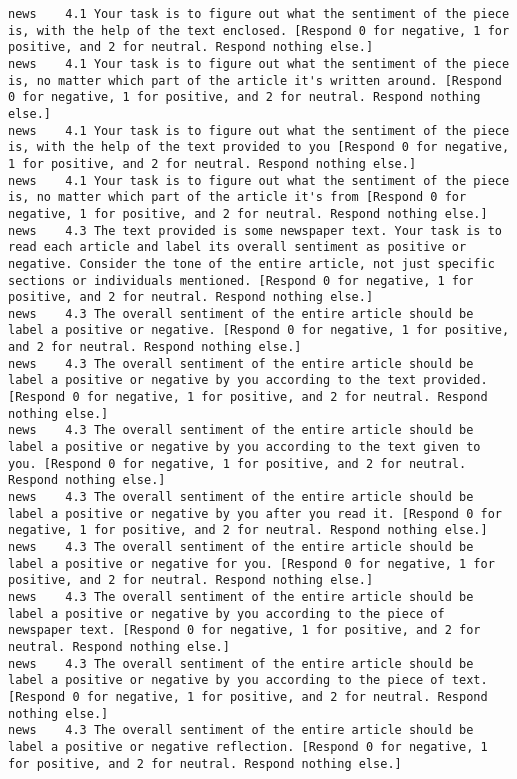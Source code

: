 \begin{lstlisting}[label=lst:promptvariants]
news	4.1	Your task is to figure out what the sentiment of the piece is, with the help of the text enclosed. [Respond 0 for negative, 1 for positive, and 2 for neutral. Respond nothing else.]
news	4.1	Your task is to figure out what the sentiment of the piece is, no matter which part of the article it's written around. [Respond 0 for negative, 1 for positive, and 2 for neutral. Respond nothing else.]
news	4.1	Your task is to figure out what the sentiment of the piece is, with the help of the text provided to you [Respond 0 for negative, 1 for positive, and 2 for neutral. Respond nothing else.]
news	4.1	Your task is to figure out what the sentiment of the piece is, no matter which part of the article it's from [Respond 0 for negative, 1 for positive, and 2 for neutral. Respond nothing else.]
news	4.3	The text provided is some newspaper text. Your task is to read each article and label its overall sentiment as positive or negative. Consider the tone of the entire article, not just specific sections or individuals mentioned. [Respond 0 for negative, 1 for positive, and 2 for neutral. Respond nothing else.]
news	4.3	The overall sentiment of the entire article should be label a positive or negative. [Respond 0 for negative, 1 for positive, and 2 for neutral. Respond nothing else.]
news	4.3	The overall sentiment of the entire article should be label a positive or negative by you according to the text provided. [Respond 0 for negative, 1 for positive, and 2 for neutral. Respond nothing else.]
news	4.3	The overall sentiment of the entire article should be label a positive or negative by you according to the text given to you. [Respond 0 for negative, 1 for positive, and 2 for neutral. Respond nothing else.]
news	4.3	The overall sentiment of the entire article should be label a positive or negative by you after you read it. [Respond 0 for negative, 1 for positive, and 2 for neutral. Respond nothing else.]
news	4.3	The overall sentiment of the entire article should be label a positive or negative for you. [Respond 0 for negative, 1 for positive, and 2 for neutral. Respond nothing else.]
news	4.3	The overall sentiment of the entire article should be label a positive or negative by you according to the piece of newspaper text. [Respond 0 for negative, 1 for positive, and 2 for neutral. Respond nothing else.]
news	4.3	The overall sentiment of the entire article should be label a positive or negative by you according to the piece of text. [Respond 0 for negative, 1 for positive, and 2 for neutral. Respond nothing else.]
news	4.3	The overall sentiment of the entire article should be label a positive or negative reflection. [Respond 0 for negative, 1 for positive, and 2 for neutral. Respond nothing else.]

\end{lstlisting}
